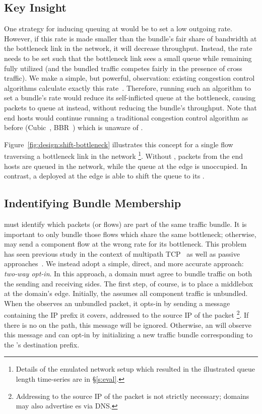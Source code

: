 \subsection{Key Insight}
One strategy for inducing queuing at \name would be to set a low outgoing rate. 
However, if this rate is made smaller than the bundle's fair share of bandwidth at the bottleneck link in the network, it will decrease throughput. 
Instead, the rate needs to be set such that the bottleneck link sees a small queue while remaining fully utilized (and the bundled traffic competes fairly in the presence of cross traffic). 
We make a simple, but powerful, observation: existing congestion control algorithms calculate exactly this rate~\cite{Jacobson88}. 
Therefore, running such an algorithm to set a bundle's rate would reduce its self-inflicted queue at the bottleneck, causing packets to queue at \name instead, without reducing the bundle's throughput.
Note that end hosts would continue running a traditional congestion control algorithm as before (\eg Cubic~\cite{cubic}, BBR~\cite{bbr}) which is unaware of \name.

Figure~\ref{fig:design:shift-bottleneck} illustrates this concept for a single flow traversing a bottleneck link in the network
\footnote{Details of the emulated network setup which resulted in the illustrated queue length time-series are in \S\ref{s:eval}.}.
Without \name, packets from the end hosts are queued in the network, while the queue at the edge is unoccupied. 
In contrast, a \name deployed at the edge is able to shift the queue to its \inbox.

\subsection{Indentifying Bundle Membership}\label{s:design:membership}
\name must identify which packets (or flows) are part of the same traffic bundle.
It is important to only bundle those flows which share the same bottleneck; otherwise, \name may send a component flow at the wrong rate for its bottleneck.
This problem has seen previous study in the context of multipath TCP~\cite{mptcp} as well as passive approaches~\cite{sharedbottlenecks}.
We instead adopt a simple, direct, and more accurate approach: \emph{two-way opt-in}.
In this approach, a domain must agree to bundle traffic on both the sending and receiving sides.
The first step, of course, is to place a \name middlebox at the domain's edge.
Initially, the \inbox assumes all component traffic is unbundled.
When the \outbox observes an unbundled packet, it opts-in by sending a message containing the IP prefix it covers, addressed to the source IP of the packet
\footnote{Addressing to the source IP of the packet is not strictly necessary; domains may also advertise \inbox{}es via \eg DNS.}.
If there is no \inbox on the path, this message will be ignored.
Otherwise, an \inbox will observe this message and can opt-in by initializing a new traffic bundle corresponding to the \outbox's destination prefix.

